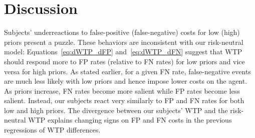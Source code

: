 \documentclass[12pt,a4paper]{article}
\newcommand{\agt}[1]{{\color{OliveGreen}#1}}
\newcommand{\aut}[1]{{\color{Red}#1}}
\begin{document}





\section{Discussion}


Subjects' underreactions to false-positive (false-negative) costs for low (high) priors present a puzzle. These behaviors are inconsistent with our risk-neutral model: Equations~\ref{eq:dWTP_dFP} and~\ref{eq:dWTP_dFN} suggest that WTP should respond more to FP rates (relative to FN rates) for low priors and vice versa for high priors. As stated earlier, for a given FN rate, false-negative events are much less likely with low priors and hence impose lower costs on the agent. As priors increase, FN rates become more salient while FP rates become less salient. Instead, our subjects react very similarly to FP and FN rates for both low and high priors. The divergence between our subjects' WTP and the risk-neutral WTP explains changing signs on FP and FN costs in the previous regressions of WTP differences.
\end{document}
